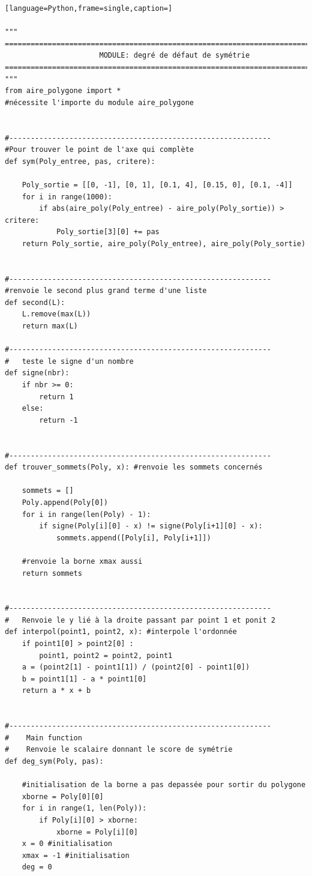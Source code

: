 \documentclass[a4paper,reqno]{article}
\begin{document}
\begin{lstlisting}[language=Python,frame=single,caption=]

"""
=================================================================================
                      MODULE: degré de défaut de symétrie
=================================================================================
"""
from aire_polygone import *
#nécessite l'importe du module aire_polygone


#-------------------------------------------------------------
#Pour trouver le point de l'axe qui complète
def sym(Poly_entree, pas, critere):

    Poly_sortie = [[0, -1], [0, 1], [0.1, 4], [0.15, 0], [0.1, -4]]
    for i in range(1000):
        if abs(aire_poly(Poly_entree) - aire_poly(Poly_sortie)) > critere:
            Poly_sortie[3][0] += pas
    return Poly_sortie, aire_poly(Poly_entree), aire_poly(Poly_sortie)


#-------------------------------------------------------------
#renvoie le second plus grand terme d'une liste
def second(L):
    L.remove(max(L))
    return max(L)

#-------------------------------------------------------------
#   teste le signe d'un nombre
def signe(nbr):
    if nbr >= 0:
        return 1
    else:
        return -1


#-------------------------------------------------------------
def trouver_sommets(Poly, x): #renvoie les sommets concernés

    sommets = []
    Poly.append(Poly[0])
    for i in range(len(Poly) - 1):
        if signe(Poly[i][0] - x) != signe(Poly[i+1][0] - x):
            sommets.append([Poly[i], Poly[i+1]])

    #renvoie la borne xmax aussi
    return sommets


#-------------------------------------------------------------
#   Renvoie le y lié à la droite passant par point 1 et ponit 2
def interpol(point1, point2, x): #interpole l'ordonnée
    if point1[0] > point2[0] :
        point1, point2 = point2, point1
    a = (point2[1] - point1[1]) / (point2[0] - point1[0])
    b = point1[1] - a * point1[0]
    return a * x + b


#-------------------------------------------------------------
#    Main function
#    Renvoie le scalaire donnant le score de symétrie
def deg_sym(Poly, pas):

    #initialisation de la borne a pas depassée pour sortir du polygone
    xborne = Poly[0][0]
    for i in range(1, len(Poly)):
        if Poly[i][0] > xborne:
            xborne = Poly[i][0]
    x = 0 #initialisation
    xmax = -1 #initialisation
    deg = 0



\end{lstlisting}
\end{document}
